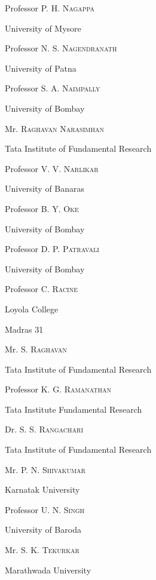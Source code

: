 Professor P. H. \textsc{Nagappa}

University of Mysore

\bigskip

Professor N. S. \textsc{Nagendranath}

University of Patna

\bigskip
 
Professor S. A. \textsc{Naimpally}

University of Bombay

\bigskip

Mr. \textsc{Raghavan Narasimhan}

Tata Institute of Fundamental Research

\bigskip

Professor V. V. \textsc{Narlikar}

University of Banaras

\bigskip

Professor B. Y. \textsc{Oke}

University of Bombay

\bigskip

Professor D. P. \textsc{Patravali}

University of Bombay

\bigskip

Professor C. \textsc{Racine}

Loyola College

Madras 31

\bigskip

Mr. S. \textsc{Raghavan}

Tata Institute of Fundamental Research

\bigskip

Professor K. G. \textsc{Ramanathan}

Tata Institute Fundamental Research

\bigskip

Dr. S. S. \textsc{Rangachari}

Tata Institute of Fundamental Research

\bigskip

Mr. P. N. \textsc{Shivakumar}

Karnatak University

\bigskip

Professor U. N. \textsc{Singh}

University of Baroda

\bigskip

Mr. S. K. \textsc{Tekurkar}

Marathwada University

